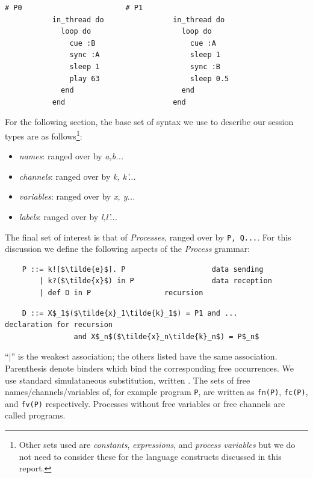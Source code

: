 \documentclass[11pt, abstracton, twoside, titlepage=true]{scrartcl}
\begin{document}
\begin{minipage}{\textwidth}
	\begin{lstlisting}[style = sonicpi]
           # P0                        # P1
           in_thread do                in_thread do 
             loop do                     loop do
               cue :B                      cue :A 
               sync :A                     sleep 1
               sleep 1                     sync :B
               play 63                     sleep 0.5
             end                         end
           end                         end
	\end{lstlisting}
	 \label{formTypes}
\end{minipage}

For the following section, the base set of syntax we use to describe our session
types are as follows\footnote{Other sets used are \emph{constants}, 
\emph{expressions}, and \emph{process variables} but we do not need to consider 
these for the language constructs discussed in this report.}:

\begin{itemize}[noitemsep]
  \item[] \emph{names}: ranged over by \emph{a,b...}
  \item[] \emph{channels}: ranged over by \emph{k, k'...}
  \item[] \emph{variables}: ranged over by \emph{x, y...}
  \item[] \emph{labels}: ranged over by \emph{l,l'...}
\end{itemize}

The final set of interest is that of \emph{Processes}, ranged over 
by \texttt{P, Q...}. For this discussion we define the following aspects 
of the \emph{Process} grammar:
\\
\begin{lstlisting}
    P ::= k![$\tilde{e}$]. P                    data sending
        | k?($\tilde{x}$) in P                  data reception
        | def D in P                 recursion
\end{lstlisting}
\begin{lstlisting}
    D ::= X$_1$($\tilde{x}_1\tilde{k}_1$) = P1 and ...           declaration for recursion
                and X$_n$($\tilde{x}_n\tilde{k}_n$) = P$_n$ 
\end{lstlisting}

``$|$'' is the weakest association; the others listed have the same association. 
Parenthesis denote binders which bind the corresponding free occurrences. We use 
standard simulataneous substitution, written $ $. The sets of free 
names/channels/variables of, for example program \texttt{P}, are written as 
\texttt{fn(P)}, \texttt{fc(P)}, and \texttt{fv(P)} respectively. Processes without 
free variables or free channels are called programs.
\end{document}
